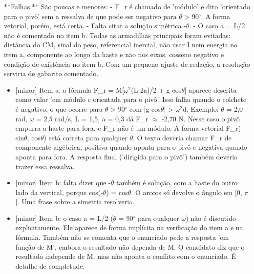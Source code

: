 \documentclass{article}%
\begin{document}
\newline%
**Falhas.** São poucas e menores:\newline%
{-} F\_r é chamado de 'módulo' e dito 'orientado para o pivô' sem a ressalva de que pode ser negativo para $\theta$ > 90$^\circ$. A forma vetorial, porém, está certa.\newline%
{-} Falta citar a solução simétrica -$\theta$.\newline%
{-} O caso a = L/2 não é comentado no item b.\newline%
\newline%
Todas as armadilhas principais foram evitadas: distância do CM, sinal do peso, referencial inercial, não usar I nem energia no item a, componente ao longo da haste e não nos eixos, cosseno negativo e condição de existência no item b. Com um pequeno ajuste de redação, a resolução serviria de gabarito comentado.%
\begin{itemize}%
\item%
{[}minor{]} Item a: a fórmula F\_r = M{[}$\omega$$^2$(L-2a)/2 + g cos$\theta${]} aparece descrita como valor 'em módulo e orientada para o pivô'. Isso falha quando o colchete é negativo, o que ocorre para $\theta$ > 90$^\circ$ com |g cos$\theta$| > $\omega$$^2$d. Exemplo: $\theta$ = 2,0 rad, $\omega$ = 2,5 rad/s, L = 1,5, a = 0,3 dá F\_r $\approx$ -2,70 N. Nesse caso o pivô empurra a haste para fora, e F\_r não é um módulo. A forma vetorial F\_r(-sin$\theta$, cos$\theta$) está correta para qualquer $\theta$. O texto deveria chamar F\_r de componente algébrica, positiva quando aponta para o pivô e negativa quando aponta para fora. A resposta final ('dirigida para o pivô') também deveria trazer essa ressalva.%
\item%
{[}minor{]} Item b: falta dizer que -$\theta$ também é solução, com a haste do outro lado da vertical, porque cos(-$\theta$) = cos$\theta$. O arccos só devolve o ângulo em {[}0, $\pi${]}. Uma frase sobre a simetria resolveria.%
\item%
{[}minor{]} Item b: o caso a = L/2 ($\theta$ = 90$^\circ$ para qualquer $\omega$) não é discutido explicitamente. Ele aparece de forma implícita na verificação do item a e na fórmula. Também não se comenta que o enunciado pede a resposta 'em função de M', embora o resultado não dependa de M. O candidato diz que o resultado independe de M, mas não aponta o conflito com o enunciado. É detalhe de completude.%
\end{itemize}%
\end{document}
